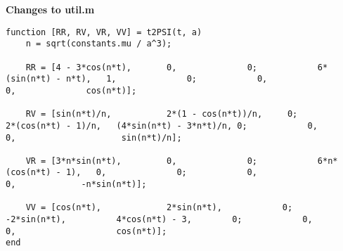 \textbf{Changes to util.m}
\begin{lstlisting}
function [RR, RV, VR, VV] = t2PSI(t, a)
    n = sqrt(constants.mu / a^3);
    
    RR = [4 - 3*cos(n*t),       0,              0;            6*(sin(n*t) - n*t),   1,              0;            0,                    0,              cos(n*t)];
        
    RV = [sin(n*t)/n,           2*(1 - cos(n*t))/n,     0;            2*(cos(n*t) - 1)/n,   (4*sin(n*t) - 3*n*t)/n, 0;            0,                    0,                     sin(n*t)/n];
        
    VR = [3*n*sin(n*t),         0,              0;            6*n*(cos(n*t) - 1),   0,              0;            0,                    0,             -n*sin(n*t)];
        
    VV = [cos(n*t),             2*sin(n*t),            0;            -2*sin(n*t),          4*cos(n*t) - 3,        0;            0,                    0,                    cos(n*t)];
end
\end{lstlisting}
